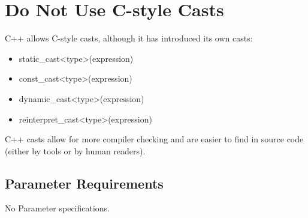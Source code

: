 %
%

\section{Do Not Use C-style Casts}
\label{DoNotUseCstyleCasts::overview}


C++ allows C-style casts, although it has introduced its own casts:

\begin{itemize}
\item{static\_cast<type>(expression)}
\item{const\_cast<type>(expression)}
\item{dynamic\_cast<type>(expression)}
\item{reinterpret\_cast<type>(expression)}
\end{itemize}

C++ casts allow for more compiler checking and are easier to find in source code
(either by tools or by human readers).

\subsection{Parameter Requirements}

   No Parameter specifications.

